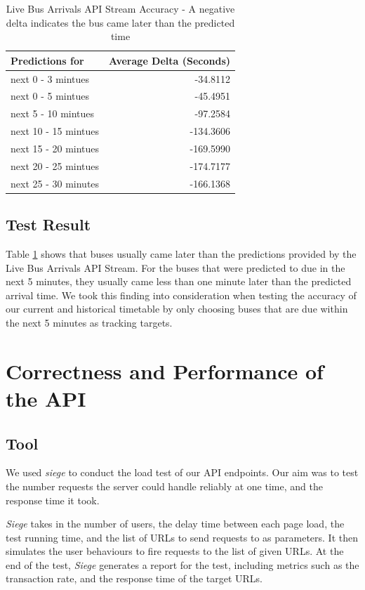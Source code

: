 \begin{table}
\centering
\begin{tabular}{@{}lr@{}} \toprule
Predictions for & Average Delta (Seconds) \\ \midrule
next 0 - 3 mintues & -34.8112 \\
next 0 - 5 mintues & -45.4951 \\
next 5 - 10 mintues & -97.2584 \\
next 10 - 15 mintues & -134.3606 \\
next 15 - 20 mintues & -169.5990 \\
next 20 - 25 mintues & -174.7177 \\
next 25 - 30 minutes & -166.1368 \\
\bottomrule
\end{tabular}
\caption{Live Bus Arrivals API Stream Accuracy - A negative delta indicates the bus came later than the predicted time}
\label{table:countdown_evaluation}
\end{table}

\subsection{Test Result}
\par Table \ref{table:countdown_evaluation} shows that buses usually came later than the predictions provided by the Live Bus Arrivals API Stream. For the buses that were predicted to due in the next 5 minutes, they usually came less than one minute later than the predicted arrival time. We took this finding into consideration when testing the accuracy of our current and historical timetable by only choosing buses that are due within the next 5 minutes as tracking targets.

\section{Correctness and Performance of the API}
\subsection{Tool}
\par We used \textit{siege}\cite{siege} to conduct the load test of our API endpoints. Our aim was to test the number requests the server could handle reliably at one time, and the response time it took.

\par \textit{Siege} takes in the number of users, the delay time between each page load, the test running time, and the list of URLs to send requests to as parameters. It then simulates the user behaviours to fire requests to the list of given URLs. At the end of the test, \textit{Siege} generates a report for the test, including metrics such as the transaction rate, and the response time of the target URLs.

